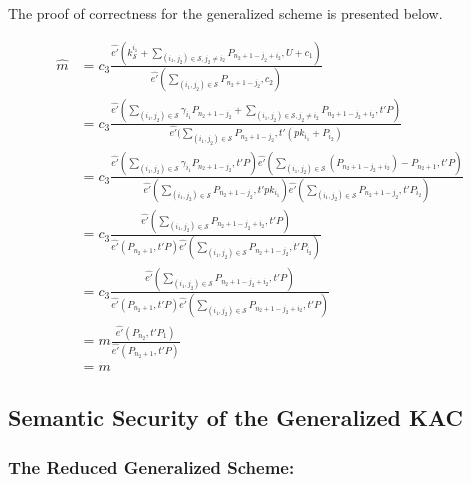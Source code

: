 The proof of correctness for the generalized scheme is presented below.

\begin{scriptsize}
\begin{equation}
\begin{split}
 \hat{m} &= c_3\frac{\hat{e'}(k^{i_1}_{\mathcal{S}}+\sum_{(i_1,j_2)\in\mathcal{S},j_2\neq i_2}P_{n_2+1-j_2+i_2},U+c_1)}{\hat{e'}(\sum_{(i_1,j_2)\in\mathcal{S}}P_{n_2+1-j_2},c_2)}\\
  &= c_3\frac{\hat{e'}(\sum_{(i_1,j_2)\in \mathcal{S}}{\gamma_{i_1}}P_{n_2+1-j_2} + \sum_{(i_1,j_2)\in\mathcal{S},j_2\neq i_2}P_{n_2+1-j_2+i_2},t'P)}{\hat{e'}(\sum_{(i_1,j_2)\in\mathcal{S}}P_{n_2+1-j_2},t'(pk_{i_1}+P_{i_2})}\\
  &= c_3\frac{\hat{e'}(\sum_{(i_1,j_2)\in \mathcal{S}}{\gamma_{i_1}}P_{n_2+1-j_2},t'P)\hat{e'}(\sum_{(i_1,j_2)\in\mathcal{S}}(P_{n_2+1-j_2+i_2})-P_{n_2+1},t'P)}{\hat{e'}(\sum_{(i_1,j_2)\in\mathcal{S}}P_{n_2+1-j_2},t'pk_{i_1})\hat{e'}(\sum_{(i_1,j_2)\in\mathcal{S}}P_{n_2+1-j_2},t'P_{i_2})}\\
  &= c_3\frac{\hat{e'}(\sum_{(i_1,j_2)\in\mathcal{S}}P_{n_2+1-j_2+i_2},t'P)}{\hat{e'}(P_{n_2+1},t'P)\hat{e'}(\sum_{(i_1,j_2)\in\mathcal{S}}P_{n_2+1-j_2},t'P_{i_2})}\\
  &= c_3\frac{\hat{e'}(\sum_{(i_1,j_2)\in\mathcal{S}}P_{n_2+1-j_2+i_2},t'P)}{\hat{e'}(P_{n_2+1},t'P)\hat{e'}(\sum_{(i_1,j_2)\in\mathcal{S}}P_{n_2+1-j_2+i_2},t'P)}\\
  &= m\frac{\hat{e'}(P_{n_2},t'P_1)}{\hat{e'}(P_{n_2+1},t'P)}\\
  &= m
\end{split}  
\end{equation}
\end{scriptsize}

\subsection{Semantic Security of the Generalized KAC}
\label{subsec:proof_general}

\subsubsection{The Reduced Generalized Scheme:}


